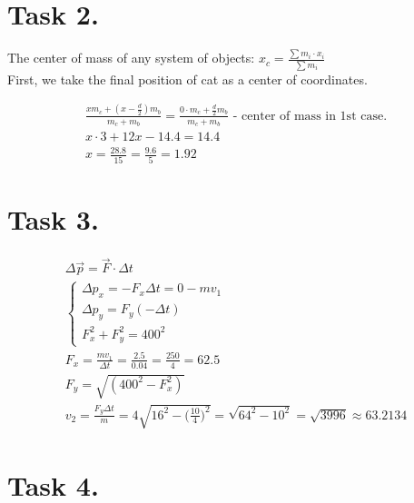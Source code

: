 \documentclass{article}
\begin{document}
\section*{Task 2.}

The center of mass of any system of objects: $x_c = \frac{\sum{m_i \cdot x_i}}{\sum{m_i}}$ \\ 
First, we take the final position of cat as a center of coordinates. 

\addtolength{\jot}{1pt}
\begin{fleqn}[1\parindent]
  \begin{gather*}
    \frac{xm_c+(x - \frac{d}{2})m_b}{m_c+m_b} = \frac{0 \cdot m_c + \frac{d}{2}m_b}{m_c+m_b}
    \text{ - center of mass in 1st case.} \\ 
    x \cdot 3 + 12x - 14.4 = 14.4 \\ 
    x = \frac{28.8}{15} = \frac{9.6}{5} = \boxed{1.92}
  \end{gather*}
\end{fleqn}

\section*{Task 3.}

\addtolength{\jot}{1pt}
\begin{fleqn}[1\parindent]
  \begin{gather*}
    \Delta \vec p = \vec F \cdot \Delta t \\
    \begin{cases}
      \Delta p_x = -F_x\Delta t = 0 - mv_1 \\ 
      \Delta p_y = F_y(-\Delta t) \\ 
      F_x^2 + F_y^2 = 400^2 
    \end{cases} \\ 
    F_x = \frac{mv_1}{\Delta t} = \frac{2.5}{0.04} = \frac{250}{4} = 62.5 \\ 
    F_y = \sqrt{(400^2 - F_x^2)} \\
    v_2 = \frac{F_y \Delta t}{m} = 4\sqrt{16^2-\Big(\frac{10}{4}\Big)^2} =
    \sqrt{64^2-10^2} = \sqrt{3996} \approx \boxed{63.2134}
  \end{gather*}
\end{fleqn}

\section*{Task 4.}
\end{document}
